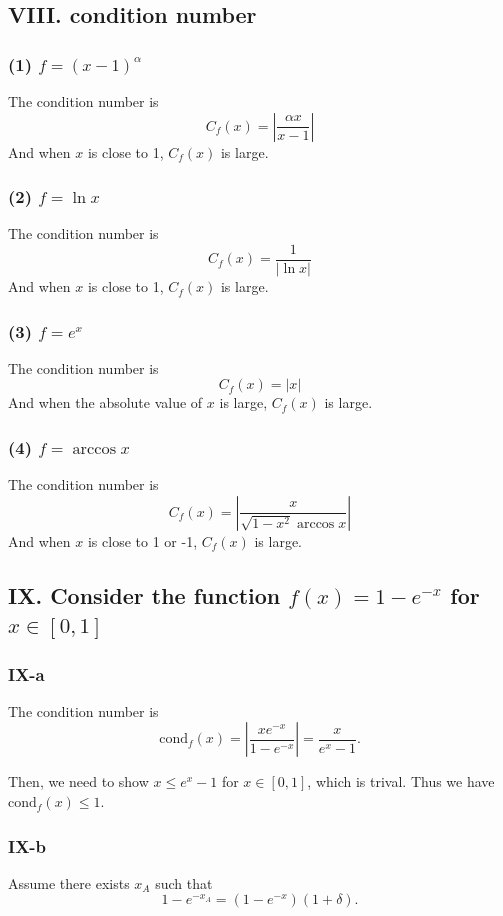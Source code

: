 \documentclass[a4paper]{article}
\newcommand{\abs}[1]{\left|#1\right|}
\begin{document}
\subsection*{VIII. condition number}
\subsubsection*{(1) $f = (x-1)^\alpha$}
The condition number is
\[
  C_f(x) = \abs{\frac{\alpha x}{x-1}}
\]
And when $x$ is close to 1, $C_f(x)$ is large.

\subsubsection*{(2) $f = \ln x$}
The condition number is
\[
  C_f(x) = \frac{1}{\abs{\ln x}}
\]
And when $x$ is close to 1, $C_f(x)$ is large.

\subsubsection*{(3) $f = e^x$}
The condition number is
\[
  C_f(x) = \abs{x}
\]
And when the absolute value of $x$ is large, $C_f(x)$ is large.

\subsubsection*{(4) $f = \arccos {x}$}
The condition number is
\[
  C_f(x) = \abs{\frac{x}{\sqrt{1-x^2}\arccos {x}}}
\]
And when $x$ is close to 1 or -1, $C_f(x)$ is large.

\subsection*{IX. Consider the function $f(x) = 1-e^{-x}$ for $x\in [0,1]$}
\subsubsection*{IX-a}
The condition number is\[ 
\text{cond}_f(x) = \abs{\frac{xe^{-x}}{1-e^{-x}}} = \frac{x}{e^{x} - 1}.
\]

Then, we need to show $x \leq e^x - 1$ for $x \in [0,1]$, which is trival. Thus we have $\text{cond}_f(x) \leq 1$.

\subsubsection*{IX-b}
Assume there exists $x_A$ such that \[
1-e^{-x_A} = (1-e^{-x})(1+\delta).  \]
\end{document}
